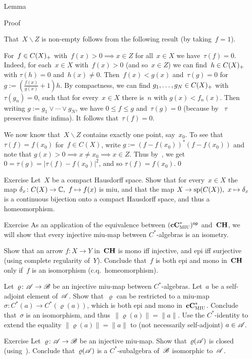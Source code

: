 \documentclass[a]{subfiles}
\begin{document}
\begin{parsec}
\begin{point}{Lemma}
\begin{point}{Proof}
\begin{point}
That~$X\backslash Z$ is non-empty
follows from the following result (by taking~$f=1$).
\end{point}
\begin{point}%
For~$f\in C(X)_{+}$
with~$f(x)> 0 \implies x\in Z$ for all~$x\in X$
we have~$\tau(f)=0$.
Indeed, for each~$x\in X$ with~$f(x)>0$
(and so~$x\in Z$)
we can find~$h\in C(X)_{+}$
with $\tau(h)=0$ and~$h(x)\neq 0$.
Then~$f(x)< g(x)$
and~$\tau(g)=0$
for $g:=(\frac{f(x)}{g(x)}+1)h$.
By compactness,
we can find $g_1,\dotsc,g_N\in C(X)_{+}$
with~$\tau(g_n)=0$,
such that for every~$x\in X$
there is~$n$ with $g(x)<f_n(x)$.
Then writing $g:=g_1\vee \dotsb \vee g_N$,
we have $0\leq f\leq g$ and~$\tau(g)=0$
(because by~
$\tau$ preserves finite infima).
It follows that~$\tau(f)=0$.
\end{point}
\begin{point}%
We now know that~$X\backslash Z$ contains exactly
one point, say~$x_0$.
To see that~$\tau(f)=f(x_0)$
for~$f\in C(X)$,
write $g:=(f-f(x_0))^*(f-f(x_0))$
and note that $g(x)>0\implies x\neq x_0\implies  x\in Z$.
Thus by~,
we get $0=\tau(g)=\left|\tau(f)-f(x_0)\right|^2$,
and so $\tau(f)=f(x_0)$.\qed
\end{point}
\end{point}
\begin{point}{Exercise}%
Let~$X$ be a compact Hausdorff space.
Show that for every~$x\in X$
the map $\delta_x\colon C(X)\to \mathbb{C},\ f\mapsto f(x)$
is miu,
and that the map $X\to \mathrm{sp}(C(X)),\ x\mapsto \delta_x$
is a continuous bijection
onto a compact Hausdorff space,
and thus a homeomorphism.
\end{point}
\end{point}
\begin{point}{Exercise}%
As an application of the equivalence
between ${(\mathbf{cC}^*_{\text{\textsc{MIU}}})}{^{\mathsf{op}}}$
and~$\mathbf{CH}$,
we will show that every injective miu-map
between $C^*$-algebras
is an isometry.

Show that an arrow $f\colon X\to Y$
in~$\mathbf{CH}$ is mono iff injective, and epi iff surjective
(using complete regularity of~$Y$).
Conclude that~$f$ is both epi and mono in~$\mathbf{CH}$
only if~$f$ is an isomorphism (c.q.~homeomorphism).

Let~$\varrho\colon \mathscr{A}\to\mathscr{B}$
be an injective miu-map between $C^*$-algebras.
Let~$a$ be a self-adjoint element of~$\mathscr{A}$.
Show that~$\varrho$ can be restricted
to a miu-map $\sigma\colon C^*(a)\to C^*(\varrho(a))$,
which is both epi and mono in~$\mathbf{cC}^*_{\text{\textsc{MIU}}}$.
Conclude that~$\sigma$ is an isomorphism,
and thus~$\|\varrho(a)\|=\|a\|$.
Use the $C^*$-identity
to extend the equality $\|\varrho(a)\|=\|a\|$ 
to (not necessarily self-adjoint) $a\in \mathscr{A}$.
\end{point}
\begin{point}{Exercise}%
Let~$\varrho\colon \mathscr{A}\to\mathscr{B}$ 
be an injective miu-map.
Show that~$\varrho(\mathscr{A})$
is closed (using~).
Conclude that~$\varrho(\mathscr{A})$
is a
 $C^*$-subalgebra of~$\mathscr{B}$
isomorphic to~$\mathscr{A}$.
\end{point}
\end{parsec}
\end{document}
